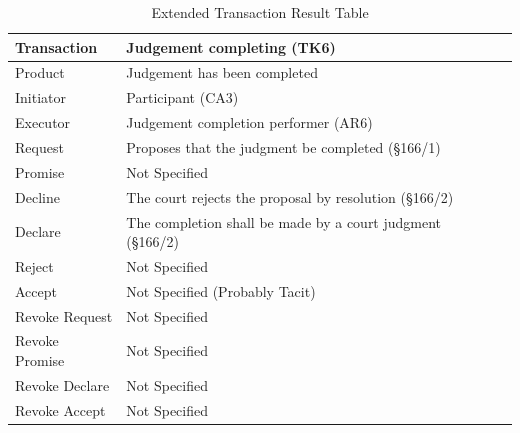 \begin{landscape}
\begin{table}[h]
\caption{Extended Transaction Result Table}
\label{tab:etrt}
\begin{tabular}{|l||l|l|}
\hline
Transaction  &  Judgement completing (TK6) \\ \hline
Product      &  Judgement has been completed \\ \hline
Initiator      & Participant (CA3)  \\ \hline
Executor       &  Judgement completion performer (AR6) \\ \hline
Request        & Proposes that the judgment be completed (\S166/1)  \\ \hline
Promise        &  Not Specified    \\ \hline
Decline        &  The court rejects the proposal by resolution (\S166/2) \\ \hline
Declare        &  The completion shall be made by a court judgment (\S166/2)  \\ \hline
Reject         &  Not Specified   \\ \hline
Accept         & Not Specified (Probably Tacit) \\ \hline
Revoke Request & Not Specified       \\ \hline
Revoke Promise & Not Specified  \\ \hline
Revoke Declare & Not Specified      \\ \hline
Revoke Accept  &  Not Specified \\ \hline
\end{tabular}
\end{table}


\end{landscape}
